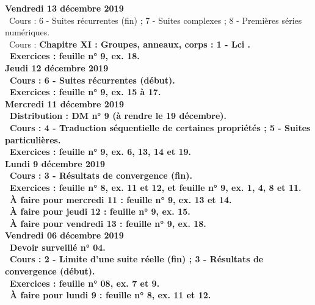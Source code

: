 \documentclass[12pt,a4paper]{article}
\begin{document}
\noindent\textbf{Vendredi 13 décembre 2019}\\
\bu\ Cours : 6 - Suites récurrentes (fin) ; 7 - Suites complexes ; 8 - Premières séries numériques.\\
\bu\ Cours : \bf Chapitre XI \rm : Groupes, anneaux, corps  : 1 - Lci .\\ 
\bu\ Exercices : feuille n° 9, ex. 18.\vspace{.4cm}\\

\noindent\textbf{Jeudi 12 décembre 2019}\\
\bu\ Cours : 6 - Suites récurrentes (début).\\
\bu\ Exercices : feuille n° 9, ex. 15 à 17.\vspace{.4cm}\\ 
 
\noindent\textbf{\bf Mercredi 11 décembre 2019}\\
\bu\ Distribution : DM n° 9 (à rendre le 19 décembre).\\
\bu\ Cours : 4 - Traduction séquentielle de certaines propriétés ; 5 - Suites particulières.\\
\bu\ Exercices : feuille n° 9, ex. 6, 13, 14 et 19.\vspace{.4cm}\\ 

\noindent\textbf{Lundi 9 décembre 2019}\\
\bu\ Cours : 3 - Résultats de convergence (fin).\\
\bu\ Exercices : feuille n° 8, ex. 11 et 12, et feuille n° 9, ex. 1, 4, 8 et 11.\\ 
\bu\ À faire pour mercredi 11 : feuille n° 9, ex. 13 et 14.\\
\bu\ À faire pour jeudi 12 : feuille n° 9, ex. 15.\\
\bu\ À faire pour vendredi 13 : feuille n° 9, ex. 18.\vspace{.4cm}\\

\noindent\textbf{Vendredi 06 décembre 2019}\\
\bu\ Devoir surveillé n° 04.\\
\bu\ Cours : 2 - Limite d'une suite réelle (fin) ; 3 - Résultats de convergence (début).\\
\bu\ Exercices : feuille n° 08, ex. 7 et 9.\\
\bu\ À faire pour lundi 9 : feuille n° 8, ex. 11 et 12.\vspace{.4cm}\\
  
\end{document}
